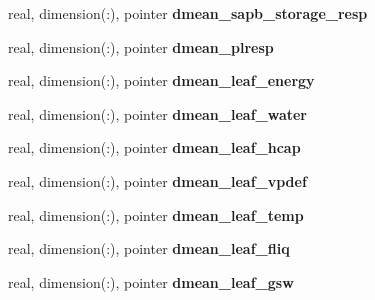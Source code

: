 \begin{DoxyCompactItemize}
\item 
\hypertarget{structed__state__vars_1_1patchtype_a90b792abcb9c9ad44a76b4f70d97f69e}{
real, dimension(:), pointer {\bfseries dmean\_\-sapb\_\-storage\_\-resp}}
\label{structed__state__vars_1_1patchtype_a90b792abcb9c9ad44a76b4f70d97f69e}

\item 
\hypertarget{structed__state__vars_1_1patchtype_a279eabea353b741c6ab240b4c990dbe0}{
real, dimension(:), pointer {\bfseries dmean\_\-plresp}}
\label{structed__state__vars_1_1patchtype_a279eabea353b741c6ab240b4c990dbe0}

\item 
\hypertarget{structed__state__vars_1_1patchtype_a552d8225bcadd698144fe6df87d533fc}{
real, dimension(:), pointer {\bfseries dmean\_\-leaf\_\-energy}}
\label{structed__state__vars_1_1patchtype_a552d8225bcadd698144fe6df87d533fc}

\item 
\hypertarget{structed__state__vars_1_1patchtype_a8d5cd7e519ffcce302dee599df7969be}{
real, dimension(:), pointer {\bfseries dmean\_\-leaf\_\-water}}
\label{structed__state__vars_1_1patchtype_a8d5cd7e519ffcce302dee599df7969be}

\item 
\hypertarget{structed__state__vars_1_1patchtype_a99d85f0f0a33a2608b7967971462f854}{
real, dimension(:), pointer {\bfseries dmean\_\-leaf\_\-hcap}}
\label{structed__state__vars_1_1patchtype_a99d85f0f0a33a2608b7967971462f854}

\item 
\hypertarget{structed__state__vars_1_1patchtype_a762210ebb60d92955d6ac13dabac2483}{
real, dimension(:), pointer {\bfseries dmean\_\-leaf\_\-vpdef}}
\label{structed__state__vars_1_1patchtype_a762210ebb60d92955d6ac13dabac2483}

\item 
\hypertarget{structed__state__vars_1_1patchtype_a30298a6cf9236b13abb4cbc3c07f6fd8}{
real, dimension(:), pointer {\bfseries dmean\_\-leaf\_\-temp}}
\label{structed__state__vars_1_1patchtype_a30298a6cf9236b13abb4cbc3c07f6fd8}

\item 
\hypertarget{structed__state__vars_1_1patchtype_a71578240e5d141118c540070f09fa628}{
real, dimension(:), pointer {\bfseries dmean\_\-leaf\_\-fliq}}
\label{structed__state__vars_1_1patchtype_a71578240e5d141118c540070f09fa628}

\item 
\hypertarget{structed__state__vars_1_1patchtype_a14928a04480e3416d4321243302b7c6e}{
real, dimension(:), pointer {\bfseries dmean\_\-leaf\_\-gsw}}
\label{structed__state__vars_1_1patchtype_a14928a04480e3416d4321243302b7c6e}


\end{DoxyCompactItemize}
